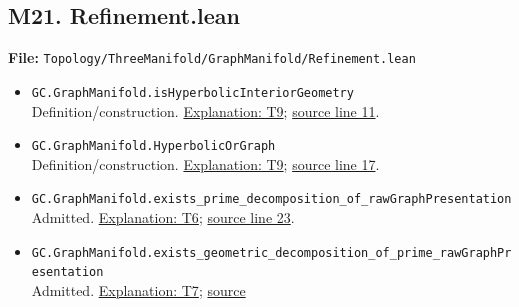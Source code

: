 \documentclass[
  letterpaper,
  11pt]{article}
\begin{document}

\subsection{M21. Refinement.lean}\label{m21.-refinement.lean}

\textbf{File:}
{\small\texttt{Topology/\allowbreak{}Three\allowbreak{}Manifold/\allowbreak{}Graph\allowbreak{}Manifold/\allowbreak{}Refinement.\allowbreak{}lean}}

\begin{itemize}
\item
  {\small\texttt{GC.\allowbreak{}Graph\allowbreak{}Manifold.\allowbreak{}is\allowbreak{}Hyperbolic\allowbreak{}Interior\allowbreak{}Geometry}}\\
  Definition/construction. \hyperref[t9]{Explanation: T9};
  \href{https://github.com/qinz1yang/differential-geometry-dev/blob/ea0fae60ee01ef8c8d9b57a51794c6538f679c5d/DifferentialGeometry/Topology/ThreeManifold/GraphManifold/Refinement.lean\#L11}{source
  line 11}.
\item
  {\small\texttt{GC.\allowbreak{}Graph\allowbreak{}Manifold.\allowbreak{}Hyperbolic\allowbreak{}Or\allowbreak{}Graph}}\\
  Definition/construction. \hyperref[t9]{Explanation: T9};
  \href{https://github.com/qinz1yang/differential-geometry-dev/blob/ea0fae60ee01ef8c8d9b57a51794c6538f679c5d/DifferentialGeometry/Topology/ThreeManifold/GraphManifold/Refinement.lean\#L17}{source
  line 17}.
\item
  {\small\texttt{GC.\allowbreak{}Graph\allowbreak{}Manifold.\allowbreak{}exists\_\allowbreak{}prime\_\allowbreak{}decomposition\_\allowbreak{}of\_\allowbreak{}raw\allowbreak{}Graph\allowbreak{}Presentation}}\\
  Admitted. \hyperref[t6]{Explanation: T6};
  \href{https://github.com/qinz1yang/differential-geometry-dev/blob/ea0fae60ee01ef8c8d9b57a51794c6538f679c5d/DifferentialGeometry/Topology/ThreeManifold/GraphManifold/Refinement.lean\#L23}{source
  line 23}.
\item
  {\small\texttt{GC.\allowbreak{}Graph\allowbreak{}Manifold.\allowbreak{}exists\_\allowbreak{}geometric\_\allowbreak{}decomposition\_\allowbreak{}of\_\allowbreak{}prime\_\allowbreak{}raw\allowbreak{}Graph\allowbreak{}Presentation}}\\
  Admitted. \hyperref[t7]{Explanation: T7};
  \href{https://github.com/qinz1yang/differential-geometry-dev/blob/ea0fae60ee01ef8c8d9b57a51794c6538f679c5d/DifferentialGeometry/Topology/ThreeManifold/GraphManifold/Refinement.lean\#L31}{source
}
\end{itemize}
\end{document}
